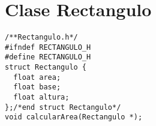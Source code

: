 \documentclass{article}
\begin{document}
\section*{Clase Rectangulo}
\begin{center}
\end{center}
\begin{verbatim}
/**Rectangulo.h*/
#ifndef RECTANGULO_H
#define RECTANGULO_H
struct Rectangulo {
  float area;
  float base;
  float altura;
};/*end struct Rectangulo*/
void calcularArea(Rectangulo *);    
\end{verbatim}
\end{document}
